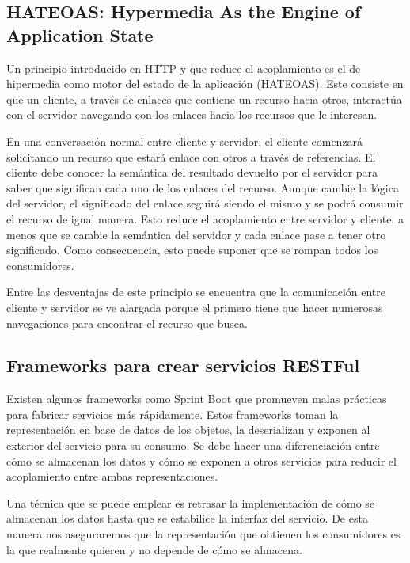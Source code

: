 \documentclass[11pt,a4paper]{article}
\begin{document}
\subsection{HATEOAS: Hypermedia As the Engine of Application State}

Un principio introducido en HTTP y que reduce el acoplamiento es el de hipermedia como motor del estado de la aplicación (HATEOAS). Este consiste en que un cliente, a través de enlaces que contiene un recurso hacia otros, interactúa con el servidor navegando con los enlaces hacia los recursos que le interesan.

En una conversación normal entre cliente y servidor, el cliente comenzará solicitando un recurso que estará enlace con otros a través de referencias. El cliente debe conocer la semántica del resultado devuelto por el servidor para saber que significan cada uno de los enlaces del recurso. Aunque cambie la lógica del servidor, el significado del enlace seguirá siendo el mismo y se podrá consumir el recurso de igual manera. Esto reduce el acoplamiento entre servidor y cliente, a menos que se cambie la semántica del servidor y cada enlace pase a tener otro significado. Como consecuencia, esto puede suponer que se rompan todos los consumidores.

Entre las desventajas de este principio se encuentra que la comunicación entre cliente y servidor se ve alargada porque el primero tiene que hacer numerosas navegaciones para encontrar el recurso que busca.

\subsection{Frameworks para crear servicios RESTFul}

Existen algunos frameworks como Sprint Boot que promueven malas prácticas para fabricar servicios más rápidamente. Estos frameworks toman la representación en base de datos de los objetos, la deserializan y exponen al exterior del servicio para su consumo. Se debe hacer una diferenciación entre cómo se almacenan los datos y cómo se exponen a otros servicios para reducir el acoplamiento entre ambas representaciones.

Una técnica que se puede emplear es retrasar la implementación de cómo se almacenan los datos hasta que se estabilice la interfaz del servicio. De esta manera nos aseguraremos que la representación que obtienen los consumidores es la que realmente quieren y no depende de cómo se almacena.
\end{document}
